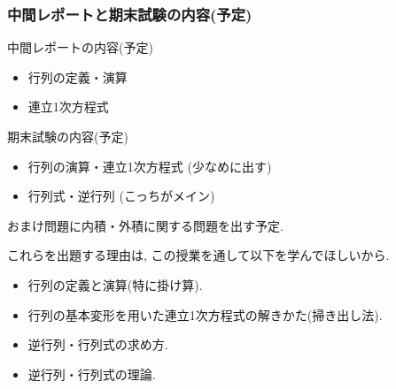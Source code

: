 \documentclass[11pt,dvipdfmx]{beamer}
\theoremstyle{definition}
\theoremstyle{remark}
\begin{document}
\begin{frame}
\frametitle{中間レポートと期末試験の内容(予定)}
    \begin{alertblock}{中間レポートの内容(予定)}
 \begin{itemize}
\item 行列の定義・演算
\item 連立1次方程式
 \end{itemize}
 \end{alertblock}

\begin{alertblock}{期末試験の内容(予定)}
 \begin{itemize}
\item 行列の演算・連立1次方程式 (少なめに出す)
\item 行列式・逆行列 (こっちがメイン)
 \end{itemize}
 おまけ問題に内積・外積に関する問題を出す予定.
  \end{alertblock}
{\small
これらを出題する理由は, この授業を通して以下を学んでほしいから.
\begin{itemize}
\item 行列の定義と演算(特に掛け算).
\item 行列の基本変形を用いた連立1次方程式の解きかた(掃き出し法).
\item 逆行列・行列式の求め方.
\item 逆行列・行列式の理論.
\end{itemize}
}

 
 \end{frame}
\end{document}

